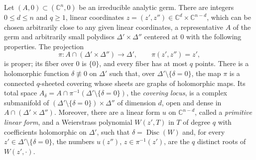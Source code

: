\begin{theorem}\label{thm:analytic-local-parametrization}
Let $(A,0)\subset(\mathbb C^n,0)$ be an irreducible analytic germ. There are integers $0\leq d\leq n$ and $q\geq1$, linear coordinates $z=(z',z'')\in\mathbb C^d\times\mathbb C^{n-d}$, which can be chosen arbitrarily close to any given linear coordinates, a representative $A$ of the germ and arbitrarily small polydiscs $\Delta'\times\Delta''$ centered at $0$ with the following properties. The projection
\[
 \pi\colon A\cap(\Delta'\times\Delta'')\longrightarrow\Delta',\qquad
 \pi(z',z'')=z',
\]
is proper; its fiber over $0$ is $\{0\}$, and every fiber has at most $q$ points. There is a holomorphic function $\delta\not\equiv0$ on $\Delta'$ such that, over $\Delta'\setminus\{\delta=0\}$, the map $\pi$ is a connected $q$-sheeted covering whose sheets are graphs of holomorphic maps. Its total space $A_\delta=A\cap\pi^{-1}(\Delta'\setminus\{\delta=0\})$, the \emph{covering locus}, is a complex submanifold of $(\Delta'\setminus\{\delta=0\})\times\Delta''$ of dimension $d$, open and dense in $A\cap(\Delta'\times\Delta'')$. Moreover, there are a linear form $u$ on $\mathbb C^{n-d}$, called a \emph{primitive linear form}, and a Weierstrass polynomial $W(z',T)$ in $T$ of degree $q$ with coefficients holomorphic on $\Delta'$, such that $\delta=\operatorname{Disc}(W)$ and, for every $z'\in\Delta'\setminus\{\delta=0\}$, the numbers $u(z'')$, $z\in\pi^{-1}(z')$, are the $q$ distinct roots of $W(z',\cdot)$.
\end{theorem}
